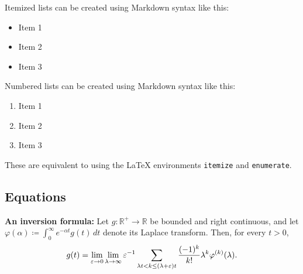 \documentclass[
12pt,
a4paper,
twoside,
]{article}
\providecommand{\tightlist}{\setlength{\itemsep}{0pt}\setlength{\parskip}{0pt}}
\begin{document}
Itemized lists can be created using Markdown syntax like this:

\begin{itemize}
\tightlist
\item
  Item 1
\item
  Item 2
\item
  Item 3
\end{itemize}

Numbered lists can be created using Markdown syntax like this:

\begin{enumerate}
\def\labelenumi{\arabic{enumi}.}
\tightlist
\item
  Item 1
\item
  Item 2
\item
  Item 3
\end{enumerate}

These are equivalent to using the LaTeX environments \texttt{itemize}
and \texttt{enumerate}.

\subsection{Equations}\label{equations}

\def\bE{\mathbf{E}}
\def\bB{\mathbf{B}}
\def\bJ{\mathbf{J}}
\def\bx{\mathbf{x}}
\def\by{\mathbf{y}}
\def\bv{\mathbf{v}}
\def\bp{\mathbf{p}}
\def\bxdot{\mathbf{\dot x}}
\def\bal{\boldsymbol{\alpha}}
\def\bphi{\boldsymbol{\varphi}}
\def\e{\varepsilon}

\textbf{An inversion formula:} Let \(g:\mathbb{R}^+\to \mathbb{R}\) be
bounded and right continuous, and let
\(\varphi(\alpha)\coloneq\int_0^\infty e^{-\alpha t}g(t)\,dt\) denote
its Laplace transform. Then, for every \(t>0\), \begin{equation}
g(t)=\lim_{\mathstrut\varepsilon\to 0}\lim_{\mathstrut\lambda\to\infty}\varepsilon^{-1}\sum_{\lambda t<k\le (\lambda+\varepsilon)t}
\frac{(-1)^k}{k!}\lambda^k\varphi ^{(k)}(\lambda).\label{eq:inversion}
\end{equation}
\end{document}
